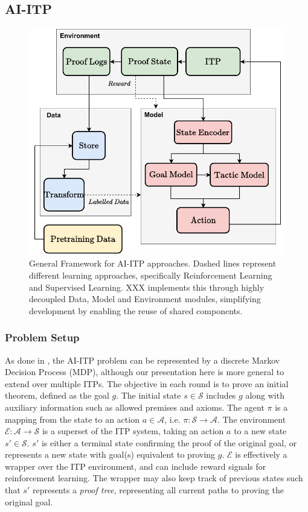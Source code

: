 \documentclass[letterpaper]{article} %
\begin{document}
    \subsection{AI-ITP}
    \begin{figure}[h]
        \centering
        \includegraphics[width=\linewidth]{AI-ITP_colour_1.drawio}
        \caption{General Framework for AI-ITP approaches. Dashed lines represent different learning approaches,
            specifically Reinforcement Learning and Supervised Learning.
            XXX implements this through highly decoupled Data, Model and Environment modules,
            simplifying development by enabling the reuse of shared components.}
        \label{fig:ai-itp}
    \end{figure}

    \subsubsection{Problem Setup}
    As done in \cite{wu_tacticzero_2021}, the AI-ITP problem can be represented by a discrete Markov Decision Process (MDP),
    although our presentation here is more general to extend over multiple ITPs.
    The objective in each round is to prove an initial theorem, defined as the goal $g$.
    The initial state $s \in \mathcal{S}$ includes $g$ along with auxiliary information such as allowed premises and axioms.
    The agent $\pi$ is a mapping from the state to an action $a \in \mathcal{A}$, i.e. $\pi: \mathcal{S} \to \mathcal{A}$.
    The environment $\mathcal{E}: \mathcal{A} \to \mathcal{S}$ is a superset of the ITP system,
    taking an action $a$ to a new state $s' \in \mathcal{S}$.
    $s'$ is either a terminal state confirming the proof of the original goal,
    or represents a new state with goal(s) equivalent to proving $g$.
    $\mathcal{E}$ is effectively a wrapper over the ITP environment, and can include reward signals for reinforcement learning.
    The wrapper may also keep track of previous states such that $s'$ represents a \textit{proof tree},
    representing all current paths to proving the original goal.
\end{document}
